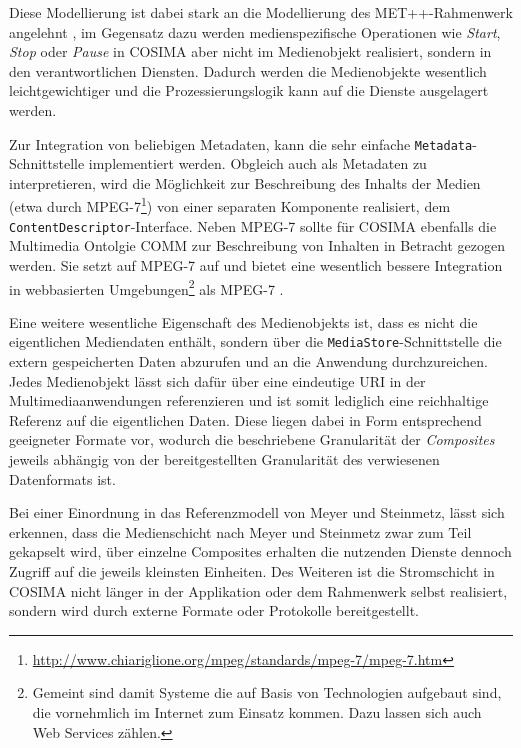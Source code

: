   Diese Modellierung ist dabei stark an die Modellierung des MET++-Rahmenwerk angelehnt \citep[S. 75]{ackermann1996doo}, im Gegensatz dazu werden medienspezifische Operationen wie \emph{Start}, \emph{Stop} oder \emph{Pause} in COSIMA aber nicht im Medienobjekt realisiert, sondern in den verantwortlichen Diensten. Dadurch werden die Medienobjekte wesentlich leichtgewichtiger und die Prozessierungslogik kann auf die Dienste ausgelagert werden.
  
  
  Zur Integration von beliebigen Metadaten, kann die sehr einfache \verb!Metadata!-Schnittstelle implementiert werden. Obgleich auch als Metadaten zu interpretieren, wird die Möglichkeit zur Beschreibung des Inhalts der Medien (etwa durch MPEG-7\footnote{\url{http://www.chiariglione.org/mpeg/standards/mpeg-7/mpeg-7.htm}}) von einer separaten Komponente realisiert, dem \verb!ContentDescriptor!-Interface. Neben MPEG-7 sollte für COSIMA ebenfalls die Multimedia Ontolgie COMM \citep{arndt2007cdw} zur Beschreibung von Inhalten in Betracht gezogen werden. Sie setzt auf MPEG-7 auf und bietet eine wesentlich bessere Integration in webbasierten Umgebungen\footnote{Gemeint sind damit Systeme die auf Basis von Technologien aufgebaut sind, die vornehmlich im Internet zum Einsatz kommen. Dazu lassen sich auch Web Services zählen.} als MPEG-7 \citep[S. 31]{arndt2007cdw}.
  
  Eine weitere wesentliche Eigenschaft des Medienobjekts ist, dass es nicht die eigentlichen Mediendaten enthält, sondern über die \verb!MediaStore!-Schnittstelle die extern gespeicherten Daten abzurufen und an die Anwendung durchzureichen. Jedes Medienobjekt lässt sich dafür über eine eindeutige URI in der Multimediaanwendungen referenzieren und ist somit lediglich eine reichhaltige Referenz auf die eigentlichen Daten. Diese liegen dabei in Form entsprechend geeigneter Formate vor, wodurch die beschriebene Granularität der \emph{Composites} jeweils abhängig von der bereitgestellten Granularität des verwiesenen Datenformats ist.
  
  Bei einer Einordnung in das Referenzmodell von Meyer und Steinmetz, lässt sich erkennen, dass die Medienschicht nach Meyer und Steinmetz zwar zum Teil gekapselt wird, über einzelne Composites erhalten die nutzenden Dienste dennoch Zugriff auf die jeweils kleinsten Einheiten. Des Weiteren ist die Stromschicht in COSIMA nicht länger in der Applikation oder dem Rahmenwerk selbst realisiert, sondern wird durch externe Formate oder Protokolle bereitgestellt.
  
